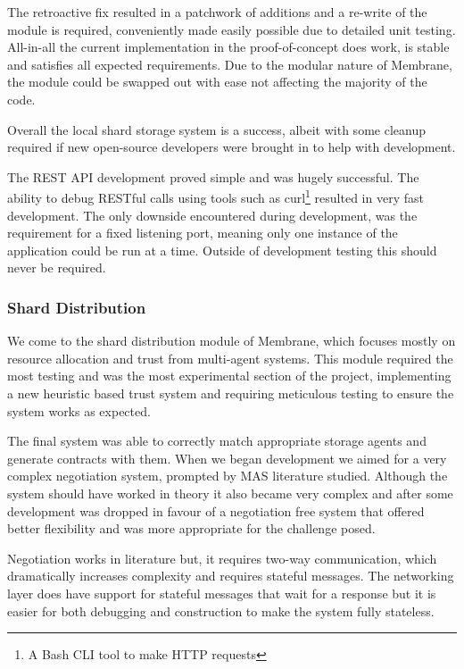 \documentclass[11pt, a4paper, twoside]{report}
\begin{document}
The retroactive fix resulted in a patchwork of additions and a re-write of the module is required, conveniently made easily possible due to detailed unit testing. All-in-all the current implementation in the proof-of-concept does work, is stable and satisfies all expected requirements. Due to the modular nature of Membrane, the module could be swapped out with ease not affecting the majority of the code.

Overall the local shard storage system is a success, albeit with some cleanup required if new open-source developers were brought in to help with development.

The REST API development proved simple and was hugely successful. The ability to debug RESTful calls using tools such as curl\footnote{A Bash CLI tool to make HTTP requests} resulted in very fast development. The only downside encountered during development, was the requirement for a fixed listening port, meaning only one instance of the application could be run at a time. Outside of development testing this should never be required.

\subsubsection{Shard Distribution}

We come to the shard distribution module of Membrane, which focuses mostly on resource allocation and trust from multi-agent systems. This module required the most testing and was the most experimental section of the project, implementing a new heuristic based trust system and requiring meticulous testing to ensure the system works as expected.

The final system was able to correctly match appropriate storage agents and generate contracts with them. When we began development we aimed for a very complex negotiation system, prompted by MAS literature studied. Although the system should have worked in theory it also became very complex and after some development was dropped in favour of a negotiation free system that offered better flexibility and was more appropriate for the challenge posed.

Negotiation works in literature but, it requires two-way communication, which dramatically increases complexity and requires stateful messages. The networking layer does have support for stateful messages that wait for a response but it is easier for both debugging and construction to make the system fully stateless.
\end{document}
